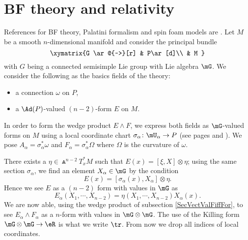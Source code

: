 \section{BF theory and relativity}

References for BF theory, Palatini formalism and spin foam models are \cite{bkindep,degesols,itospinfoam}. Let $M$ be a smooth $n$-dimensional manifold and consider the principal bundle
\begin{equation}
\xymatrix{%
 G   \ar@{~>}[r]		&	P\ar[d]\\
   				&	M
 }
\end{equation}
with $G$ being a connected semisimple Lie group with Lie algebra $\mG$. We consider the following as the basics fields of the theory:
\begin{itemize}
\item a connection $\omega$ on $P$,
\item a $\Ad(P)$-valued $(n-2)$-form $E$ on $M$.
\end{itemize}
In order to form the wedge product $E\wedge F$, we express both fields as $\mG$-valued forms on $M$ using a local coordinate chart $\sigma_{\alpha}\colon \mU_{\alpha}\to P$ (see pages \pageref{PgLocSecCurv} and \pageref{PgLocSecConn} ). We pose $A_{\alpha}=\sigma_{\alpha}^*\omega$ and $F_{\alpha}=\sigma_{\alpha}^*\Omega$ where $\Omega$ is the curvature of $\omega$.

There exists a $\eta\in\Wedge^{n-2}T_x^*M$ such that $E(x)=[\xi,X]\otimes\eta$; using the same section $\sigma_{\alpha}$, we find an element $X_{\alpha}\in\mG$ by the condition
\[ 
  E(x)=[\sigma_{\alpha}(x),X_{\alpha}]\otimes\eta.
\]
Hence we see $E$ as a $(n-2)$ form with values in $\mG$ as
\begin{equation}
E_{\alpha}(X_1,\cdots,X_{n-2})=\eta(X_1,\cdots,X_{n-2})X_{\alpha}(x).
\end{equation}
We are now able, using the wedge product of subsection \ref{SecVectValFiffFor}, to see $E_{\alpha}\wedge F_{\alpha}$ as a $n$-form with values in $\mG\otimes\mG$. The use of the Killing form $\mG\otimes\mG\to\eR$ is what we write $\tr$. From now we drop all indices of local coordinates.

